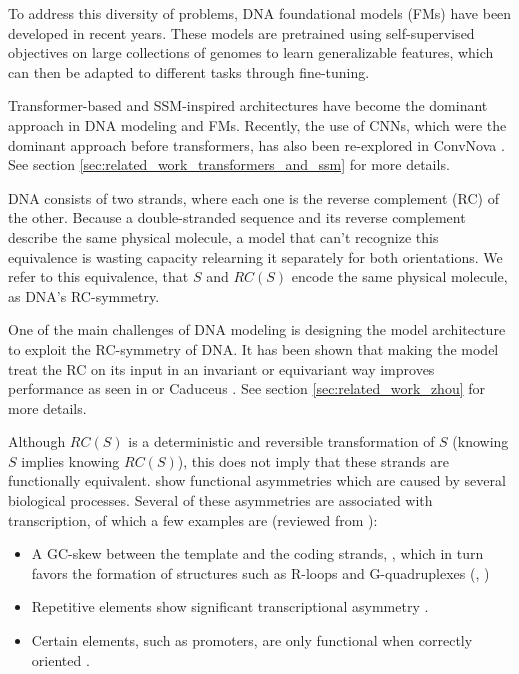 \documentclass[   ]{article}
\begin{document}
To address this diversity of problems, DNA foundational models (FMs)
have been developed in recent years. These models are pretrained using
self-supervised objectives on large collections of genomes to learn
generalizable features, which can then be adapted to different tasks
through fine-tuning.

Transformer-based and SSM-inspired architectures have become the dominant approach in DNA modeling and FMs. Recently, the use of CNNs, which were the dominant approach before transformers, has also been re-explored in ConvNova \citep{boRevisitingConvolutionArchitecture2025}. See section \ref{sec:related_work_transformers_and_ssm} for more details.

DNA consists of two strands, where each one is the reverse complement (RC) of the other. Because a double-stranded sequence and its reverse complement describe the same physical molecule, a model that can't recognize this equivalence is wasting capacity relearning it separately for both orientations. We refer to this equivalence, that $S$ and $RC(S)$ encode the same physical molecule, as DNA's RC-symmetry.

One of the main challenges of DNA modeling is designing the model architecture to exploit the RC-symmetry of DNA. It has been shown that making the model treat the RC on its input in an invariant or equivariant way improves performance as seen in \citet{zhouBetterUnderstandingReverseComplement2021} or Caduceus \citep{schiffCaduceusBiDirectionalEquivariant2024}. See section \ref{sec:related_work_zhou} for more details.

Although \(RC(S)\) is a deterministic and reversible transformation of
\(S\) (knowing \(S\) implies knowing \(RC(S)\)), this does not
imply that these strands are functionally equivalent. \citet{moeckelStrandAsymmetriesGenomic2023} show functional asymmetries which are caused by several biological
processes. Several of
these asymmetries are associated with transcription, of which a few examples are (reviewed from \citet{moeckelStrandAsymmetriesGenomic2023}):
\begin{itemize}
	\item A GC-skew between the template and the coding strands,
	\citep{greenTranscriptionassociatedMutationalAsymmetry2003}, which in turn favors the formation of structures such as R-loops and G-quadruplexes
	(\citet{ginnoRloopFormationDistinctive2012},
	\citet{maoDNAGquadruplexStructures2018})
	\item Repetitive elements show significant transcriptional asymmetry
	\citep{georgakopoulos-soaresAsymmetronToolkitIdentification2021}.
	\item Certain elements, such as promoters, are only functional when correctly
	oriented \citep{duttkeHumanPromotersAre2015}.
\end{itemize}
\end{document}
